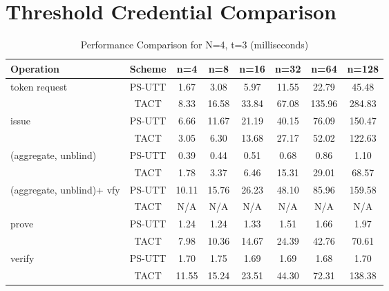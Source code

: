 
\section{Threshold Credential Comparison}

\begin{table}[htbp]
\centering
\caption{Performance Comparison for N=4, t=3 (milliseconds)}
\begin{tabular}{lccccccc}
\toprule
\textbf{Operation} & \textbf{Scheme} & \textbf{n=4} & \textbf{n=8} & \textbf{n=16} & \textbf{n=32} & \textbf{n=64} & \textbf{n=128} \\
\midrule
token request & PS-UTT & 1.67 & 3.08 & 5.97 & 11.55 & 22.79 & 45.48 \\
 & TACT & 8.33 & 16.58 & 33.84 & 67.08 & 135.96 & 284.83 \\
\midrule
issue & PS-UTT & 6.66 & 11.67 & 21.19 & 40.15 & 76.09 & 150.47 \\
 & TACT & 3.05 & 6.30 & 13.68 & 27.17 & 52.02 & 122.63 \\
\midrule
(aggregate, unblind) & PS-UTT & 0.39 & 0.44 & 0.51 & 0.68 & 0.86 & 1.10 \\
 & TACT & 1.78 & 3.37 & 6.46 & 15.31 & 29.01 & 68.57 \\
\midrule
(aggregate, unblind)+ vfy & PS-UTT & 10.11 & 15.76 & 26.23 & 48.10 & 85.96 & 159.58 \\
 & TACT & N/A & N/A & N/A & N/A & N/A & N/A \\
\midrule
prove & PS-UTT & 1.24 & 1.24 & 1.33 & 1.51 & 1.66 & 1.97 \\
 & TACT & 7.98 & 10.36 & 14.67 & 24.39 & 42.76 & 70.61 \\
\midrule
verify & PS-UTT & 1.70 & 1.75 & 1.69 & 1.69 & 1.68 & 1.70 \\
 & TACT & 11.55 & 15.24 & 23.51 & 44.30 & 72.31 & 138.38 \\
\bottomrule
\end{tabular}
\label{tab:perf-comp-4-3}
\end{table}


